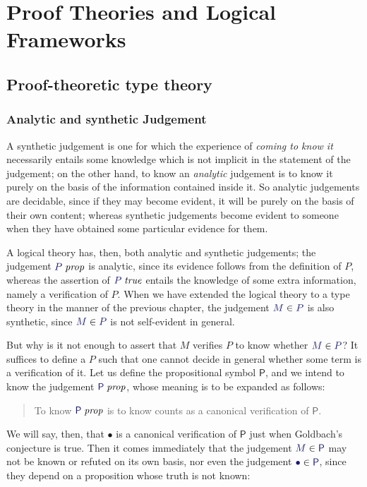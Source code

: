 \documentclass[main.tex]{subfiles}
\begin{document}
\onehalfspacing

\chapter{Proof Theories and Logical Frameworks}

\section{Proof-theoretic type theory}

\subsection{Analytic and synthetic Judgement}

A synthetic judgement is one for which the experience of \emph{coming
to know it} necessarily entails some knowledge which is not implicit
in the statement of the judgement; on the other hand, to know an
\emph{analytic} judgement is to know it purely on the basis of the
information contained inside it. So analytic judgements are decidable,
since if they may become evident, it will be purely on the basis of
their own content; whereas synthetic judgements become evident to
someone when they have obtained some particular evidence for them.

A logical theory has, then, both analytic and synthetic judgements;
the judgement $\isprop{P}$ is analytic, since its evidence follows
from the definition of $P$, whereas the assertion of $\istrue{P}$
entails the knowledge of some extra information, namely a verification
of $P$. When we have extended the logical theory to a type theory in
the manner of the previous chapter, the judgement $\ver{M}{P}$ is
also synthetic, since $\ver{M}{P}$ is not self-evident in general.

But why is it not enough to assert that $M$ verifies $P$ to know
whether $\ver{M}{P}$? It suffices to define a $P$ such that one cannot
decide in general whether some term is a verification of it. Let us
define the propositional symbol $\mathsf{P}$, and we intend to know
the judgement $\isprop{\mathsf{P}}$, whose meaning is to be expanded as
follows:
\begin{quote}
  To know $\isprop{\mathsf{P}}$ is to know counts as a canonical verification of $\mathsf{P}$.
\end{quote}

We will say, then, that $\bullet$ is a canonical verification of
$\mathsf{P}$ just when Goldbach's conjecture is true. Then it comes
immediately that the judgement $\ver{M}{\mathsf{P}}$ may not be known
or refuted on its own basis, nor even the judgement
$\ver{\bullet}{\mathsf{P}}$, since they depend on a proposition whose
truth is not known:
\end{document}
